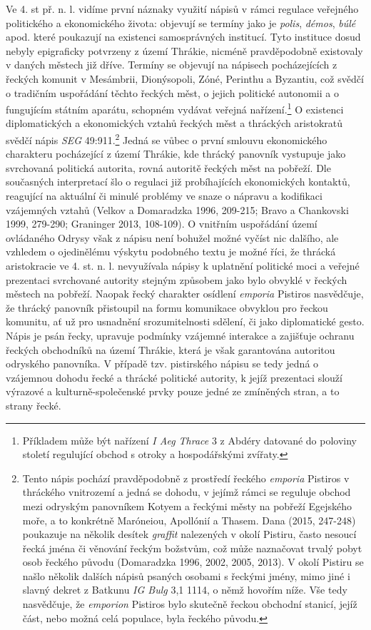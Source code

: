 Ve 4. st př. n. l. vidíme první náznaky využití nápisů v rámci regulace veřejného politického a ekonomického života: objevují se termíny jako je {\em polis}, {\em démos}, {\em búlé} apod. které poukazují na existenci samosprávných institucí. Tyto instituce dosud nebyly epigraficky potvrzeny z území Thrákie, nicméně pravděpodobně existovaly v daných městech již dříve. Termíny se objevují na nápisech pocházejících z řeckých komunit v Mesámbrii, Dionýsopoli, Zóné, Perinthu a Byzantiu, což svědčí o tradičním uspořádání těchto řeckých měst, o jejich politické autonomii a o fungujícím státním aparátu, schopném vydávat veřejná nařízení.\footnote{Příkladem může být nařízení {\em I Aeg Thrace} 3 z Abdéry datované do poloviny století regulující obchod s otroky a hospodářskými zvířaty.} O existenci diplomatických a ekonomických vztahů řeckých měst a thráckých aristokratů svědčí nápis {\em SEG} 49:911.\footnote{Tento nápis pochází pravděpodobně z prostředí řeckého {\em emporia} Pistiros v thráckého vnitrozemí a jedná se dohodu, v jejímž rámci se reguluje obchod mezi odryským panovníkem Kotyem a řeckými městy na pobřeží Egejského moře, a to konkrétně Maróneiou, Apollónií a Thasem. Dana (2015, 247-248) poukazuje na několik desítek {\em graffit} nalezených v okolí Pistiru, často nesoucí řecká jména či věnování řeckým božstvům, což může naznačovat trvalý pobyt osob řeckého původu (Domaradzka 1996, 2002, 2005, 2013). V okolí Pistiru se našlo několik dalších nápisů psaných osobami s řeckými jmény, mimo jiné i slavný dekret z Batkunu {\em IG Bulg} 3,1 1114, o němž hovořím níže. Vše tedy nasvědčuje, že {\em emporion} Pistiros bylo skutečně řeckou obchodní stanicí, jejíž část, nebo možná celá populace, byla řeckého původu.} Jedná se vůbec o první smlouvu ekonomického charakteru pocházející z území Thrákie, kde thrácký panovník vystupuje jako svrchovaná politická autorita, rovná autoritě řeckých měst na pobřeží. Dle současných interpretací šlo o regulaci již probíhajících ekonomických kontaktů, reagující na aktuální či minulé problémy ve snaze o nápravu a kodifikaci vzájemných vztahů (Velkov a Domaradzka 1996, 209-215; Bravo a Chankovski 1999, 279-290; Graninger 2013, 108-109). O vnitřním uspořádání území ovládaného Odrysy však z nápisu není bohužel možné vyčíst nic dalšího, ale vzhledem o ojedinělému výskytu podobného textu je možné říci, že thrácká aristokracie ve 4. st. n. l. nevyužívala nápisy k uplatnění politické moci a veřejné prezentaci svrchované autority stejným způsobem jako bylo obvyklé v řeckých městech na pobřeží. Naopak řecký charakter osídlení {\em emporia} Pistiros nasvědčuje, že thrácký panovník přistoupil na formu komunikace obvyklou pro řeckou komunitu, ať už pro usnadnění srozumitelnosti sdělení, či jako diplomatické gesto. Nápis je psán řecky, upravuje podmínky vzájemné interakce a zajišťuje ochranu řeckých obchodníků na území Thrákie, která je však garantována autoritou odryského panovníka. V případě tzv. pistirského nápisu se tedy jedná o vzájemnou dohodu řecké a thrácké politické autority, k jejíž prezentaci slouží výrazové a kulturně-společenské prvky pouze jedné ze zmíněných stran, a to strany řecké.

